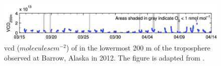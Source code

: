 \begin{figure}
    \centering
    \includegraphics[width =0.9\linewidth]{Appendix/images/Peterson_2015.jpeg}
    \caption{\acrlong{vcd} ($molecules cm^{-2}$) of  in the lowermost 200 m of the troposphere observed at Barrow, Alaska in 2012. The figure is adapted from \cite{Peterson2015}.}
    \label{fig:Peterson_2015}
\end{figure}